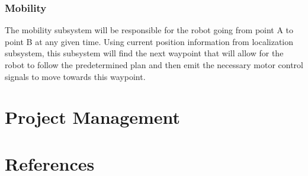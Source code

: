 \documentclass{article}
\begin{document}
		\subsubsection{Mobility}
			The mobility subsystem will be responsible for the robot going from point A to point B at any given time. Using current position information from localization subsystem, this subsystem will find the next waypoint that will allow for the robot to follow the predetermined plan and then emit the necessary motor control signals to move towards this waypoint. 

\section{Project Management}

\section{References}
\end{document}

